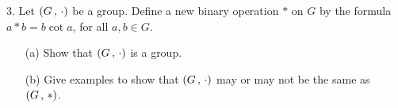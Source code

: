 \newpage
\begin{mdframed}[style=darkQuesion]
  3. Let $\left(G\,,\,\cdot\right)$ be a group. Define a new binary operation $\ast$ on
  $G$ by the formula $a \ast b=b\cot a$, for all $a,b\in G$.
  \begin{itemize}
    \item[(a)]{Show that $\left(G\,,\,\cdot\right)$ is a group.}
    \item[(b)]{Give examples to show that $\left(G\,,\,\cdot\right)$ may or may not be the
                same as $\left(G\,,\,\ast\right)$.}
  \end{itemize}
\end{mdframed}

